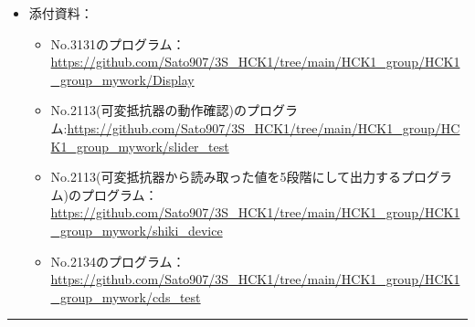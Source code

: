 \documentclass[uplatex,dvipdfmx,a4paper,11pt]{jsarticle}
\newcommand{\sectionrule}{\par\medskip\noindent\rule{\linewidth}{0.6pt}\par\medskip}
\begin{document}
\begin{itemize}
  \item 添付資料：
    \begin{itemize}
      \item No.3131のプログラム：\url{https://github.com/Sato907/3S_HCK1/tree/main/HCK1_group/HCK1_group_mywork/Display}
      \item No.2113(可変抵抗器の動作確認)のプログラム:\url{https://github.com/Sato907/3S_HCK1/tree/main/HCK1_group/HCK1_group_mywork/slider_test}
      \item No.2113(可変抵抗器から読み取った値を5段階にして出力するプログラム)のプログラム：\url{https://github.com/Sato907/3S_HCK1/tree/main/HCK1_group/HCK1_group_mywork/shiki_device}
      \item No.2134のプログラム：\url{https://github.com/Sato907/3S_HCK1/tree/main/HCK1_group/HCK1_group_mywork/cds_test}

    \end{itemize}

\end{itemize}

\sectionrule
\end{document}
